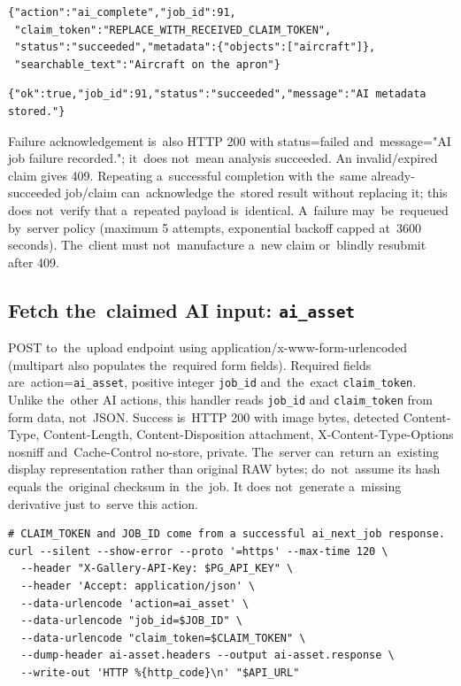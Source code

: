 \documentclass[11pt,a4paper]{article}
\newcommand{\codeword}[1]{\nolinkurl{#1}}
\begin{document}
\begin{lstlisting}[language={}]
{"action":"ai_complete","job_id":91,
 "claim_token":"REPLACE_WITH_RECEIVED_CLAIM_TOKEN",
 "status":"succeeded","metadata":{"objects":["aircraft"]},
 "searchable_text":"Aircraft on the apron"}
\end{lstlisting}

\begin{lstlisting}[language={}]
{"ok":true,"job_id":91,"status":"succeeded","message":"AI metadata stored."}
\end{lstlisting}

Failure acknowledgement is~also HTTP 200 with status=failed and~message="AI job failure
recorded."; it~does not~mean analysis succeeded. An invalid/expired claim gives 409.
Repeating a~successful completion with the~same already-succeeded job/claim can~acknowledge
the~stored result without replacing it; this does not~verify that a~repeated payload
is~identical. A~failure may~be~requeued by~server policy (maximum 5 attempts, exponential
backoff capped at~3600 seconds). The~client must not~manufacture a~new claim or~blindly
resubmit after 409.

\subsection{\texorpdfstring{Fetch the~claimed AI input: \codeword{ai_asset}}{Fetch the claimed AI input: ai\_asset}}

\label{api352:ai-asset}

POST to~the~upload endpoint using application/x-www-form-urlencoded (multipart also
populates the~required form fields). Required fields are~action=\codeword{ai_asset},
positive integer \codeword{job_id} and~the~exact \codeword{claim_token}. Unlike the~other AI
actions, this handler reads \codeword{job_id} and \codeword{claim_token} from form data,
not~JSON. Success is~HTTP 200 with image bytes, detected Content-Type, Content-Length,
Content-Disposition attachment, X-Content-Type-Options nosniff and~Cache-Control no-store,
private. The~server can~return an~existing display representation rather than original RAW
bytes; do~not~assume its hash equals the~original checksum in~the~job. It does not~generate
a~missing derivative just to~serve this action.

\begin{lstlisting}[language={}]
# CLAIM_TOKEN and JOB_ID come from a successful ai_next_job response.
curl --silent --show-error --proto '=https' --max-time 120 \
  --header "X-Gallery-API-Key: $PG_API_KEY" \
  --header 'Accept: application/json' \
  --data-urlencode 'action=ai_asset' \
  --data-urlencode "job_id=$JOB_ID" \
  --data-urlencode "claim_token=$CLAIM_TOKEN" \
  --dump-header ai-asset.headers --output ai-asset.response \
  --write-out 'HTTP %{http_code}\n' "$API_URL"
\end{lstlisting}
\end{document}
